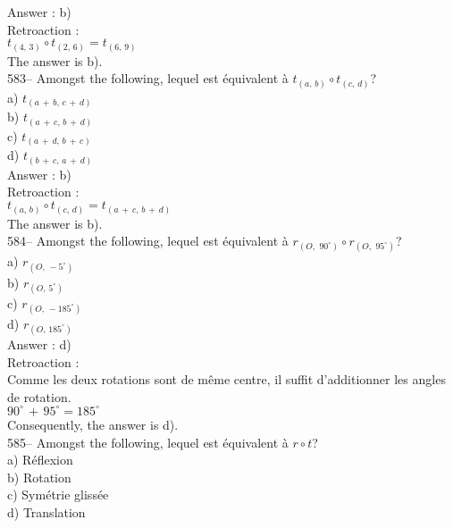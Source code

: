﻿\documentclass[letterpaper, 12pt]{article}
\begin{document}
Answer : b)\\

Retroaction : \\
$t_{\left(4,\,3\right)} \circ t_{\left(2,\,6\right) }= t_{\left(6,\,9\right)
}$\\
The answer is b).\\

583-- Amongst the following, lequel est \'equivalent \`a
$t_{\left(a,\,b\right)} \circ t_{\left(c,\,d\right) }$?\\
a) $t_{\left(a\,+\,b,\,c\,+\,d\right) }$\\
b) $t_{\left(a\,+\,c,\,b\,+\,d\right) }$\\
c) $t_{\left(a\,+\,d,\,b\,+\,c\right) }$\\
d) $t_{\left(b\,+\,c,\,a\,+\,d\right) }$\\

Answer : b)\\

Retroaction : \\
$t_{\left(a,\,b\right)} \circ t_{\left(c,\,d\right)
}=t_{\left(a\,+\,c,\,b\,+\,d\right) }$\\
The answer is b).\\

584-- Amongst the following, lequel est \'equivalent \`a
$r_{\left( O,\,\,90^{\circ}\right)} \circ r_{\left( O,\,\,95^{\circ}\right)
}$?\\
a) $r_{\left(O,\,-5^{\circ}\right) }$\\
b) $r_{\left(O,\,5^{\circ}\right) }$\\
c) $r_{\left(O,\,-185^{\circ}\right) }$\\
d) $r_{\left(O,\,185^{\circ}\right) }$\\

Answer : d)\\

Retroaction : \\
Comme les deux rotations sont de m\^eme centre, il suffit d'additionner les
angles de rotation.\\
$90^{\circ}\,+\,95^{\circ}=185^{\circ}$\\
Consequently, the answer is d).\\

585-- Amongst the following, lequel est \'equivalent \`a $r\circ
t$?\\
a) R\'eflexion\\
b) Rotation\\
c) Sym\'etrie gliss\'ee\\
d) Translation\\
\end{document}
